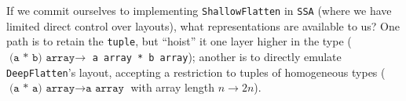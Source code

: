 




If we commit ourselves to implementing \texttt{ShallowFlatten} in \texttt{SSA}
(where we have limited direct control over layouts), what representations are
available to us? One path is to retain the \texttt{tuple}, but ``hoist'' it one
layer higher in the type ($\texttt{(a * b) array} \to$ \texttt{a array *
b array}); another is to directly emulate \texttt{DeepFlatten}'s layout,
accepting a restriction to tuples of homogeneous types ($\texttt{(a * a)
array} \to \texttt{a array}$ with array length $n \to 2n$).

